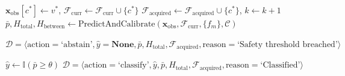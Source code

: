 \begin{algorithm}[t]
\begin{algorithmic}[1]
    \STATE $\mathbf{x}_{\text{obs}}[c^*] \leftarrow v^*$, \quad $\mathcal{F}_{\text{curr}} \leftarrow \mathcal{F}_{\text{curr}} \cup \{c^*\}$
    \STATE $\mathcal{F}_{\text{acquired}} \leftarrow \mathcal{F}_{\text{acquired}} \cup \{c^*\}$, \quad $k \leftarrow k + 1$
    \STATE $\bar{p}, H_{\text{total}}, H_{\text{between}} \leftarrow \text{PredictAndCalibrate}(\mathbf{x}_{\text{obs}}, \mathcal{F}_{\text{curr}}, \{f_m\}, \mathcal{C})$
\ENDWHILE

\STATE {}
    \RETURN $\mathcal{D} = \langle \text{action}=\text{`abstain'}, \hat{y}=\textbf{None}, \bar{p}, H_{\text{total}}, \mathcal{F}_{\text{acquired}}, \text{reason}=\text{`Safety threshold breached'} \rangle$
\ENDIF

\STATE $\hat{y} \leftarrow \mathbb{I}(\bar{p} \ge \theta)$
\RETURN $\mathcal{D} = \langle \text{action}=\text{`classify'}, \hat{y}, \bar{p}, H_{\text{total}}, \mathcal{F}_{\text{acquired}}, \text{reason}=\text{`Classified'} \rangle$
\end{algorithmic}
\end{algorithm}

